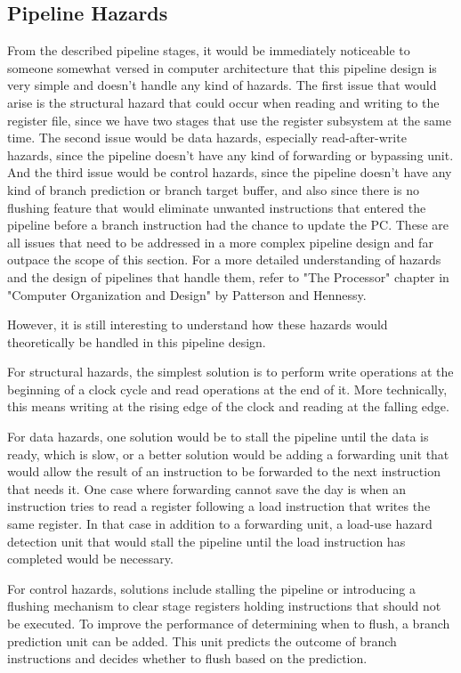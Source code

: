 \subsection{Pipeline Hazards}
From the described pipeline stages, it would be immediately noticeable to someone somewhat versed in computer architecture that this pipeline design is very simple and doesn't handle any kind of hazards. The first issue that would arise is the structural hazard that could occur when reading and writing to the register file, since we have two stages that use the register subsystem at the same time. The second issue would be data hazards, especially read-after-write hazards, since the pipeline doesn't have any kind of forwarding or bypassing unit. And the third issue would be control hazards, since the pipeline doesn't have any kind of branch prediction or branch target buffer, and also since there is no flushing feature that would eliminate unwanted instructions that entered the pipeline before a branch instruction had the chance to update the PC. These are all issues that need to be addressed in a more complex pipeline design and far outpace the scope of this section. For a more detailed understanding of hazards and the design of pipelines that handle them, refer to "The Processor" chapter in "Computer Organization and Design" by Patterson and Hennessy\cite{patterson1994computer}.

However, it is still interesting to understand how these hazards would theoretically be handled in this pipeline design.

For structural hazards, the simplest solution is to perform write operations at the beginning of a clock cycle and read operations at the end of it. More technically, this means writing at the rising edge of the clock and reading at the falling edge\cite{patterson1994computer}.

For data hazards, one solution would be to stall the pipeline until the data is ready, which is slow, or a better solution would be adding a forwarding unit that would allow the result of an instruction to be forwarded to the next instruction that needs it. One case where forwarding cannot save the day is when an instruction tries to read a register following a load instruction that writes the same register\cite{patterson1994computer}. In that case in addition to a forwarding unit, a load-use hazard detection unit that would stall the pipeline until the load instruction has completed would be necessary.

For control hazards, solutions include stalling the pipeline or introducing a flushing mechanism to clear stage registers holding instructions that should not be executed. To improve the performance of determining when to flush, a branch prediction unit can be added. This unit predicts the outcome of branch instructions and decides whether to flush based on the prediction\cite{patterson1994computer}.

